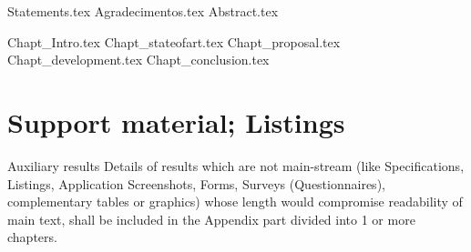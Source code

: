 \documentclass[
  oneside,
  11pt, a4paper,
  footinclude=true,
  headinclude=true,
  cleardoublepage=empty
]{scrbook}
\author{Full name}
\date{\myear} %
\begin{document}
        \umfrontcover
        \umtitlepage

{Statements.tex}
{Agradecimentos.tex}
{Abstract.tex}


        \tableofcontents
        \listoffigures
        \listoftables
        \printglossary[type=\acronymtype]
        \clearpage
        \thispagestyle{empty}



{Chapt_Intro.tex}
{Chapt_stateofart.tex}
{Chapt_proposal.tex}
{Chapt_development.tex}
{Chapt_conclusion.tex}




        


        \chapter{Support material; Listings}
        Auxiliary results Details of results which are not main-stream (like Specifications, Listings, Application Screenshots,
        Forms, Surveys (Questionnaires), complementary tables or graphics)
        whose length would compromise readability of main text,
        shall be included in the Appendix part divided into 1 or more chapters.



  
\end{document}

